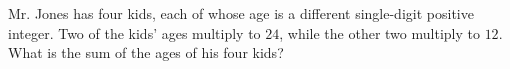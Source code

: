 Mr. Jones has four kids, each of whose age is a different single-digit positive integer. Two of the kids' ages multiply to $24$, while the other two multiply to $12$. What is the sum of the ages of his four kids?

